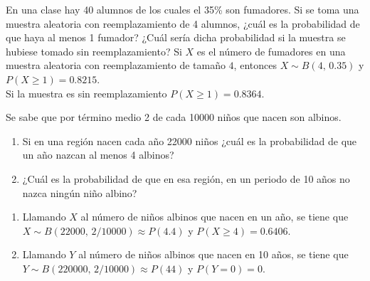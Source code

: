 {En una clase hay 40 alumnos de los cuales el 35\% son fumadores.
Si se toma una muestra aleatoria con reemplazamiento de 4 alumnos, ¿cuál es la probabilidad de que haya al menos 1
fumador?
¿Cuál sería dicha probabilidad si la muestra se hubiese tomado sin reemplazamiento?}
{Si $X$ es el número de fumadores en una muestra aleatoria con reemplazamiento de tamaño $4$, entonces $X\sim
B(4,\,0.35)$ y $P(X\geq 1)=0.8215$.\\
Si la muestra es sin reemplazamiento $P(X\geq 1)= 0.8364$.}
{}


{Se sabe que por término medio 2 de cada 10000 niños que nacen son albinos.
\begin{enumerate}
\item Si en una región nacen cada año 22000 niños ¿cuál es la probabilidad de que un año nazcan al menos 4 albinos?
\item ¿Cuál es la probabilidad de que en esa región, en un periodo de 10 años no nazca ningún niño albino?
\end{enumerate}
}
{
\begin{enumerate}
\item Llamando $X$ al número de niños albinos que nacen en un año, se tiene que $X\sim B(22000,\,2/10000)\approx
P(4.4)$ y $P(X\geq 4)=0.6406$.
\item Llamando $Y$ al número de niños albinos que nacen en 10 años, se tiene que $Y\sim B(220000,\,2/10000)\approx
P(44)$ y $P(Y=0)=0$.
\end{enumerate}
}
{}


